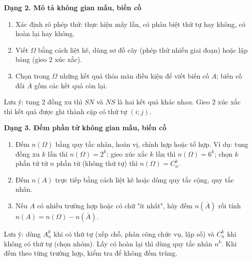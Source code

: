 \textbf{Dạng 2. Mô tả không gian mẫu, biến cố}
\begin{enumerate}
\item Xác định rõ phép thử: thực hiện mấy lần, có phân biệt thứ tự hay không, có hoàn lại hay không.
\item Viết $\Omega$ bằng cách liệt kê, dùng sơ đồ cây (phép thử nhiều giai đoạn) hoặc lập bảng (gieo $2$ xúc xắc).
\item Chọn trong $\Omega$ những kết quả thỏa mãn điều kiện để viết biến cố $A$; biến cố đối $\overline{A}$ gồm các kết quả còn lại.
\end{enumerate}
Lưu ý: tung $2$ đồng xu thì $SN$ và $NS$ là hai kết quả khác nhau. Gieo $2$ xúc xắc thì kết quả được ghi thành cặp có thứ tự $(i;j)$.

\textbf{Dạng 3. Đếm phần tử không gian mẫu, biến cố}
\begin{enumerate}
\item Đếm $n(\Omega)$ bằng quy tắc nhân, hoán vị, chỉnh hợp hoặc tổ hợp. Ví dụ: tung đồng xu $k$ lần thì $n(\Omega)=2^k$; gieo xúc xắc $k$ lần thì $n(\Omega)=6^k$; chọn $k$ phần tử từ $n$ phần tử (không thứ tự) thì $n(\Omega)=C_n^k$.
\item Đếm $n(A)$ trực tiếp bằng cách liệt kê hoặc dùng quy tắc cộng, quy tắc nhân.
\item Nếu $A$ có nhiều trường hợp hoặc có chữ "ít nhất", hãy đếm $n\left(\overline{A}\right)$ rồi tính $n(A)=n(\Omega)-n\left(\overline{A}\right)$.
\end{enumerate}
Lưu ý: dùng $A_n^k$ khi có thứ tự (xếp chỗ, phân công chức vụ, lập số) và $C_n^k$ khi không có thứ tự (chọn nhóm). Lấy có hoàn lại thì dùng quy tắc nhân $n^k$. Khi đếm theo từng trường hợp, kiểm tra để không đếm trùng.
